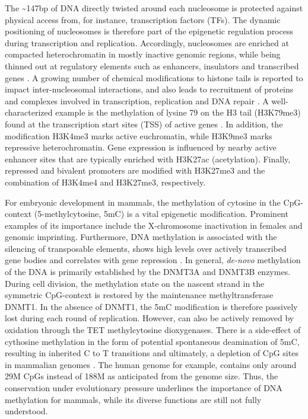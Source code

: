 The \textasciitilde 147bp of DNA directly twisted around each nucleosome is protected against physical access from, for instance, transcription factors (TFs). 
The dynamic positioning of nucleosomes is therefore part of the epigenetic regulation process during transcription and replication.
Accordingly, nucleosomes are enriched at compacted heterochromatin in mostly inactive genomic regions, while being thinned out at regulatory elements such as enhancers, insulators and transcribed genes \cite{Klemm2019}. 
A growing number of chemical modifications to histone tails is reported to impact inter-nucleosomal interactions, and also leads to recruitment of proteins and complexes involved in transcription, replication and DNA repair \cite{Bannister2011}. 
A well-characterized example is the methylation of lysine 79 on the H3 tail (H3K79me3) found at the transcription start sites (TSS) of active genes \cite{Lawrence2016}. 
In addition, the modification H3K4me3 marks active euchromatin, while H3K9me3 marks repressive heterochromatin.
Gene expression is influenced by nearby active enhancer sites that are typically enriched with H3K27ac (acetylation).
Finally, repressed and bivalent promoters are modified with H3K27me3 and the combination of H3K4me4 and H3K27me3, respectively.

For embryonic development in mammals, the methylation of cytosine in the CpG-context (5-methylcytosine, 5mC) is a vital epigenetic modification. Prominent examples of its importance include the X-chromosome inactivation in females and genomic imprinting.
Furthermore, DNA methylation is associated with the silencing of transposable elements, shows high levels over actively transcribed gene bodies and correlates with gene repression \cite{Greenberg2019}.
In general, \textit{de-novo} methylation of the DNA is primarily established by the DNMT3A and DNMT3B enzymes. 
During cell division, the methylation state on the nascent strand in the symmetric CpG-context is restored by the maintenance methyltransferase DNMT1.
In the absence of DNMT1, the 5mC modification is therefore passively lost during each round of replication. 
However, can also be actively removed by oxidation through the TET methylcytosine dioxygenases.
There is a side-effect of cythosine methylation in the form of potential spontaneous deamination of 5mC, resulting in inherited C to T transitions and ultimately, a depletion of CpG sites in mammalian genomes \cite{Holliday1993}. 
The human genome for example, contains only around 29M CpGs instead of 188M as anticipated from the genome size. 
Thus, the conservation under evolutionary pressure underlines the importance of DNA methylation for mammals, while its diverse functions are still not fully understood.


